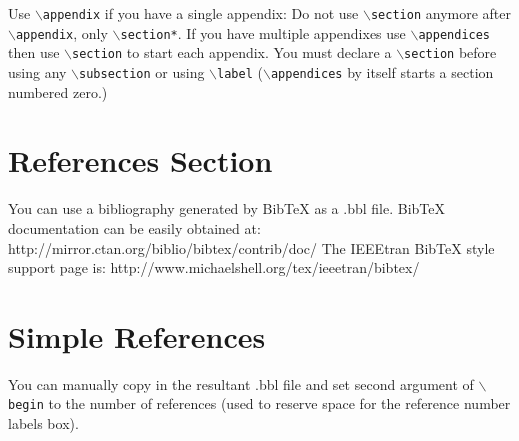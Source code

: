 \documentclass[lettersize,journal]{IEEEtran}
\begin{document}
        {
    Use $\backslash${\tt{appendix}} if you have a single appendix:
    Do not use $\backslash${\tt{section}} anymore after $\backslash${\tt{appendix}}, only $\backslash${\tt{section*}}.
    If you have multiple appendixes use $\backslash${\tt{appendices}} then use $\backslash${\tt{section}} to start each appendix.
    You must declare a $\backslash${\tt{section}} before using any $\backslash${\tt{subsection}} or using $\backslash${\tt{label}} ($\backslash${\tt{appendices}} by itself
    starts a section numbered zero.)}






    \section{References Section}
    You can use a bibliography generated by BibTeX as a .bbl file.
    BibTeX documentation can be easily obtained at:
    http://mirror.ctan.org/biblio/bibtex/contrib/doc/
    The IEEEtran BibTeX style support page is:
    http://www.michaelshell.org/tex/ieeetran/bibtex/

%
%
    \section{Simple References}
    You can manually copy in the resultant .bbl file and set second argument of $\backslash${\tt{begin}} to the number of references
    (used to reserve space for the reference number labels box).
\end{document}
